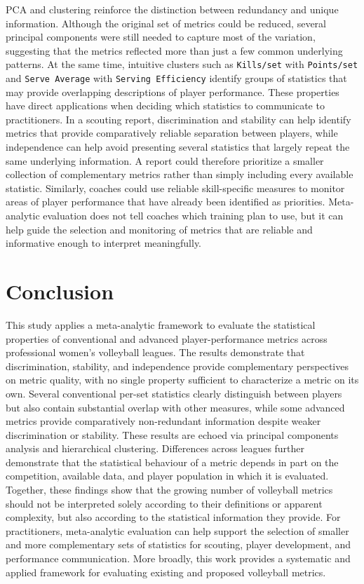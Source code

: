 \documentclass[
  12pt]{article}
\begin{document}
PCA and clustering reinforce the distinction between redundancy and
unique information. Although the original set of metrics could be
reduced, several principal components were still needed to capture most
of the variation, suggesting that the metrics reflected more than just a
few common underlying patterns. At the same time, intuitive clusters
such as \texttt{Kills/set} with \texttt{Points/set} and
\texttt{Serve\ Average} with \texttt{Serving\ Efficiency} identify
groups of statistics that may provide overlapping descriptions of player
performance. These properties have direct applications when deciding
which statistics to communicate to practitioners. In a scouting report,
discrimination and stability can help identify metrics that provide
comparatively reliable separation between players, while independence
can help avoid presenting several statistics that largely repeat the
same underlying information. A report could therefore prioritize a
smaller collection of complementary metrics rather than simply including
every available statistic. Similarly, coaches could use reliable
skill-specific measures to monitor areas of player performance that have
already been identified as priorities. Meta-analytic evaluation does not
tell coaches which training plan to use, but it can help guide the
selection and monitoring of metrics that are reliable and informative
enough to interpret meaningfully.

\section{Conclusion}\label{conclusion}

This study applies a meta-analytic framework to evaluate the statistical
properties of conventional and advanced player-performance metrics
across professional women's volleyball leagues. The results demonstrate
that discrimination, stability, and independence provide complementary
perspectives on metric quality, with no single property sufficient to
characterize a metric on its own. Several conventional per-set
statistics clearly distinguish between players but also contain
substantial overlap with other measures, while some advanced metrics
provide comparatively non-redundant information despite weaker
discrimination or stability. These results are echoed via principal
components analysis and hierarchical clustering. Differences across
leagues further demonstrate that the statistical behaviour of a metric
depends in part on the competition, available data, and player
population in which it is evaluated. Together, these findings show that
the growing number of volleyball metrics should not be interpreted
solely according to their definitions or apparent complexity, but also
according to the statistical information they provide. For
practitioners, meta-analytic evaluation can help support the selection
of smaller and more complementary sets of statistics for scouting,
player development, and performance communication. More broadly, this
work provides a systematic and applied framework for evaluating existing
and proposed volleyball metrics.
\end{document}
